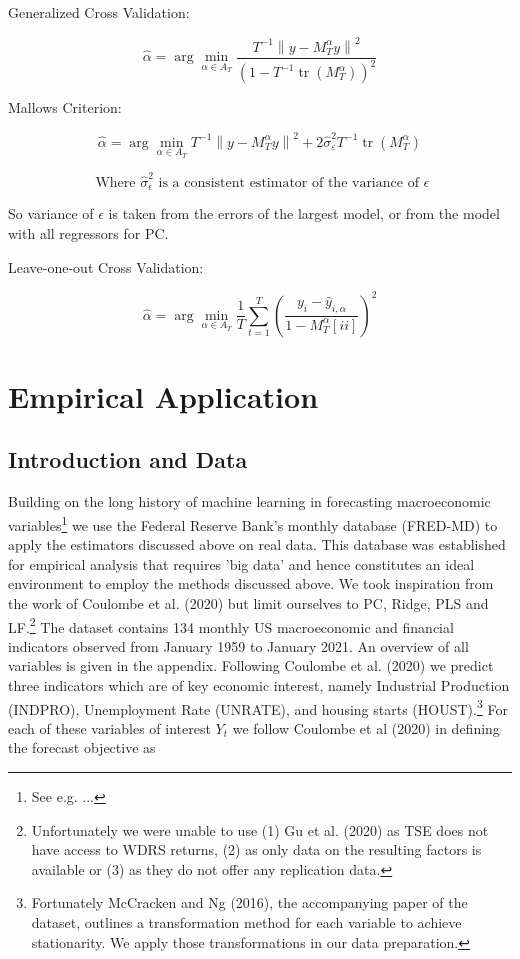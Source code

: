 Generalized Cross Validation:

\[\hat{\alpha}=\arg \min _{\alpha \in A_{T}} \frac{T^{-1}\left\|y-M_{T}^{\alpha} y\right\|^{2}}{\left(1-T^{-1} \operatorname{tr}\left(M_{T}^{\alpha}\right)\right)^{2}}\]

Mallows Criterion:

\[\hat{\alpha}=\arg \min _{\alpha \in A_{T}} T^{-1}\left\|y-M_{T}^{\alpha} y\right\|^{2}+2 \widehat{\sigma}_{\varepsilon}^{2} T^{-1} \operatorname{tr}\left(M_{T}^{\alpha}\right)\]

\[\text{ Where } \widehat{\sigma}_{\epsilon}^{2} \text{ is a consistent estimator of the variance of } \epsilon\]

So variance of $\epsilon$ is taken from the errors of the largest model, or from the model with all regressors for PC.

Leave-one-out Cross Validation:

\[\hat{\alpha}=\arg \min _{\alpha \in A_{T}} \frac{1}{T} \sum_{t=1}^{T}\left(\frac{y_{i}-\hat{y}_{i, \alpha}}{1-M_{T}^{\alpha}[ii]}\right)^{2}\]




\clearpage

\section{Empirical Application}
\subsection{Introduction and Data}
Building on the long history of machine learning in forecasting macroeconomic variables\footnote{See e.g. ...} we use the Federal Reserve Bank's monthly database (FRED-MD) to apply the estimators discussed above on real data. This database was established for empirical analysis that requires 'big data' and hence constitutes an ideal environment to employ the methods discussed above. We took inspiration from the work of Coulombe et al. (2020) but limit ourselves to PC, Ridge, PLS and LF.\footnote{Unfortunately we were unable to use (1) Gu et al. (2020) as TSE does not have access to WDRS returns, (2) as only data on the resulting factors is available or (3) as they do not offer any replication data.} 
The dataset contains 134 monthly US macroeconomic and financial indicators observed from January 1959 to January 2021. An overview of all variables is given in the appendix. 
Following Coulombe et al. (2020) we predict three indicators which are of key economic interest, namely Industrial Production (INDPRO), Unemployment Rate (UNRATE), and housing starts (HOUST).\footnote{Fortunately McCracken and Ng (2016), the accompanying paper of the dataset, outlines a transformation method for each variable to achieve stationarity. We apply those transformations in our data preparation.}
For each of these variables of interest $Y_t$ we follow Coulombe et al (2020) in defining the forecast objective as

